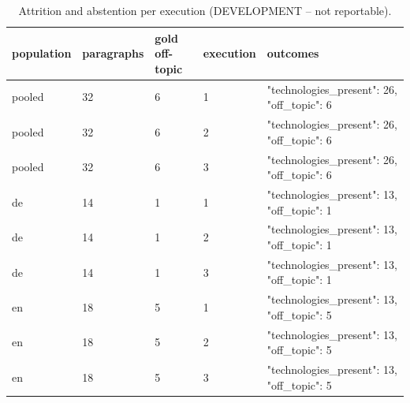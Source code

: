 \begin{table}[htbp]
\centering
\small
\begin{tabular}{lllll}
\toprule
\textbf{population} & \textbf{paragraphs} & \textbf{gold off-topic} & \textbf{execution} & \textbf{outcomes} \\
\midrule
pooled & 32 & 6 & 1 & {"technologies\_present": 26, "off\_topic": 6} \\
pooled & 32 & 6 & 2 & {"technologies\_present": 26, "off\_topic": 6} \\
pooled & 32 & 6 & 3 & {"technologies\_present": 26, "off\_topic": 6} \\
de & 14 & 1 & 1 & {"technologies\_present": 13, "off\_topic": 1} \\
de & 14 & 1 & 2 & {"technologies\_present": 13, "off\_topic": 1} \\
de & 14 & 1 & 3 & {"technologies\_present": 13, "off\_topic": 1} \\
en & 18 & 5 & 1 & {"technologies\_present": 13, "off\_topic": 5} \\
en & 18 & 5 & 2 & {"technologies\_present": 13, "off\_topic": 5} \\
en & 18 & 5 & 3 & {"technologies\_present": 13, "off\_topic": 5} \\
\bottomrule
\end{tabular}
\caption{Attrition and abstention per execution (DEVELOPMENT -- not reportable).}
\end{table}
